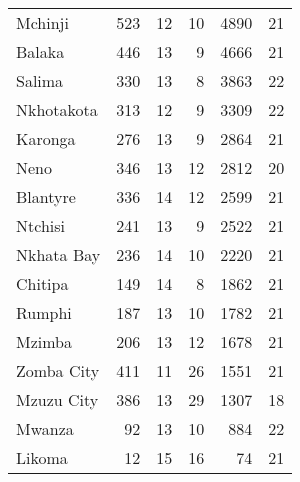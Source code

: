 \begin{tabular}{lrrrrr}
Mchinji       &         523 &          12 &           10 &             4890 &          21 \\
Balaka        &         446 &          13 &            9 &             4666 &          21 \\
Salima        &         330 &          13 &            8 &             3863 &          22 \\
Nkhotakota    &         313 &          12 &            9 &             3309 &          22 \\
Karonga       &         276 &          13 &            9 &             2864 &          21 \\
Neno          &         346 &          13 &           12 &             2812 &          20 \\
Blantyre      &         336 &          14 &           12 &             2599 &          21 \\
Ntchisi       &         241 &          13 &            9 &             2522 &          21 \\
Nkhata Bay    &         236 &          14 &           10 &             2220 &          21 \\
Chitipa       &         149 &          14 &            8 &             1862 &          21 \\
Rumphi        &         187 &          13 &           10 &             1782 &          21 \\
Mzimba        &         206 &          13 &           12 &             1678 &          21 \\
Zomba City    &         411 &          11 &           26 &             1551 &          21 \\
Mzuzu City    &         386 &          13 &           29 &             1307 &          18 \\
Mwanza        &          92 &          13 &           10 &              884 &          22 \\
Likoma        &          12 &          15 &           16 &               74 &          21 \\
\bottomrule
\end{tabular}
